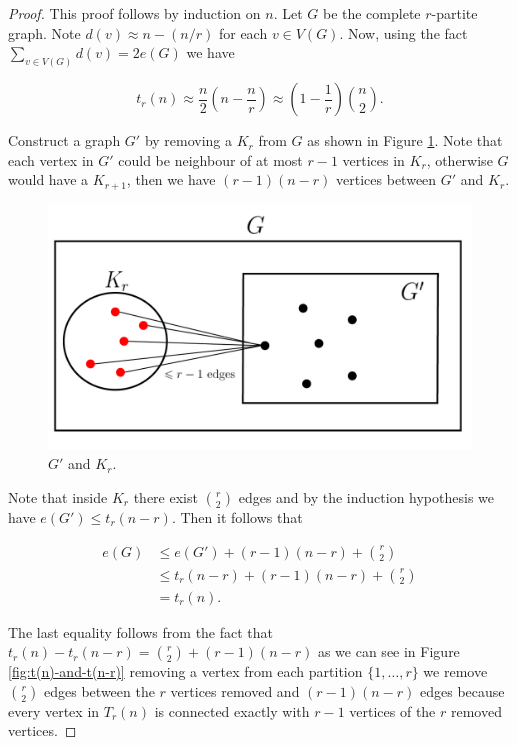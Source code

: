 \documentclass[12pt,twoside,a4paper,bibliography=totocnumbered]{book}
\numberwithin{equation}{section}
\theoremstyle{remark}
\begin{document}
\begin{proof}
This proof follows by induction on $n$. Let $G$ be the complete $r$-partite graph. Note $d(v) \approx n-(n/r)$ for each $v \in V(G)$. Now, using the fact $\sum_{v\in V(G)} d(v) = 2 e(G)$ we have

$$ t_r(n) \approx \frac{n}{2}\left(n-\frac{n}{r}\right) \approx \left(1-\frac{1}{r}\right) \binom{n}{2}.$$

Construct a graph $G'$ by removing a $K_r$ from $G$ as shown in Figure \ref{fig:G'andKr}. Note that each vertex in $G'$ could be neighbour of at most $r-1$ vertices in $K_r$, otherwise $G$ would have a $K_{r+1}$, then we have $(r-1)(n-r)$ vertices between $G'$ and $K_r$.
 
 \begin{figure}[H]
     \centering
     \includegraphics[scale=1]{Figuras/Kr+1-livre-prova-turan.jpg}
     \caption{$G'$ and $K_r$.}
     \label{fig:G'andKr}
\end{figure}

Note that inside $K_r$ there exist $\binom{r}{2}$ edges and by the induction hypothesis we have $e(G') \leq t_r(n-r)$. Then it follows that

\begin{align*}
e(G) &\leq e(G') + (r-1)(n-r) + \binom{r}{2}\\
&\leq t_r(n-r) +(r-1)(n-r) + \binom{r}{2}\\
&= t_r(n).
\end{align*}

The last equality follows from the fact that $t_r(n) - t_r(n-r) = \binom{r}{2} + (r-1)(n-r)$ as we can see in Figure \ref{fig:t(n)-and-t(n-r)} removing a vertex from each partition $\{1,\ldots,r\}$ we remove $\binom{r}{2}$ edges between the $r$ vertices removed and $(r-1)(n-r)$ edges  because every vertex in $T_r(n)$ is connected exactly with $r-1$ vertices of the $r$ removed vertices.   


\end{proof}
\end{document}
